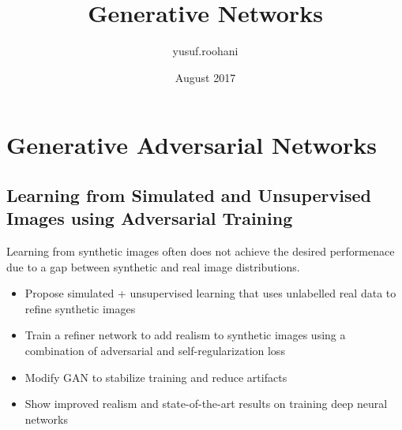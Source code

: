\documentclass{article}
\title{Generative Networks}
\author{yusuf.roohani }
\date{August 2017}
\begin{document}
\maketitle

\section{Generative Adversarial Networks}

\subsection{Learning from Simulated and Unsupervised Images using Adversarial Training \cite{shrivastava2016learning}} 

Learning from synthetic images often does not achieve the desired performenace due to a gap between synthetic and real image distributions. 

\begin{itemize}

    \item Propose simulated + unsupervised learning that uses unlabelled real data to refine synthetic images
    \item Train a refiner network to add realism to synthetic images using a combination of adversarial and self-regularization loss
    \item Modify GAN to stabilize training and reduce artifacts
    \item Show improved realism and state-of-the-art results on training deep neural networks

\end{itemize}



\end{document}
